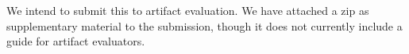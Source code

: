 \documentclass[acmsmall,screen,nonacm,review,anonymous]{acmart}
\begin{document}
We intend to submit this to artifact evaluation.
We have attached a zip as supplementary material to the submission, though it does not
currently include
a guide for artifact evaluators.



\end{document}
